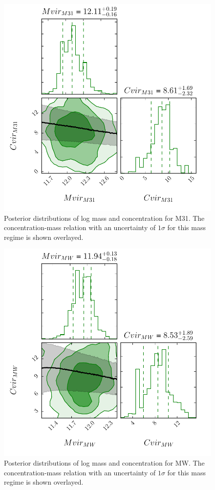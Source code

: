 \documentclass[iop,apj,twocolappendix,numberedappendix]{emulateapj}
\begin{document}
\begin{figure}[ht]
\includegraphics[width=\linewidth]{figures/Q_GMMP_M31_MvsC.pdf}
\caption{Posterior distributions of log mass and concentration for M31. The concentration-mass relation with an uncertainty of $1\sigma$ for this mass regime is shown overlayed.}
\label{fig:Q_GMMP_M31_MvsC}
\end{figure}

\begin{figure}[ht]
\includegraphics[width=\linewidth]{figures/Q_GMMP_MW_MvsC.pdf}
\caption{Posterior distributions of log mass and concentration for MW. The concentration-mass relation with an uncertainty of $1\sigma$ for this mass regime is shown overlayed.}
\label{fig:Q_GMMP_MW_MvsC}
\end{figure}
\end{document}
